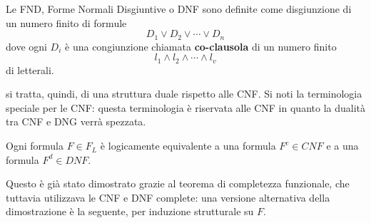 \begin{defi}
Le FND, Forme Normali Disgiuntive o DNF sono definite come disgiunzione di 
un numero finito di formule 
$$
D_1 \lor D_2 \lor \cdots \lor D_n
$$
dove ogni $D_i$ è una congiunzione chiamata \textbf{co-clausola} di un numero finito 
$$
l_1 \land l_2 \land \cdots \land l_v
$$
di letterali. 
\end{defi}

si tratta, quindi, di una struttura duale rispetto alle CNF. 
Si noti la terminologia speciale per le CNF: questa terminologia è riservata 
alle CNF in quanto la dualità tra CNF e DNG verrà spezzata. 

\begin{lem}
Ogni formula $F \in F_L$ è logicamente equivalente a una formula $F^c \in CNF$ 
e a una formula $F^d \in DNF$.
\end{lem}

Questo è già stato dimostrato grazie al teorema 
di completezza funzionale, che tuttavia utilizzava le CNF e DNF complete: una 
versione alternativa della dimostrazione è la seguente, per induzione strutturale 
su $F$. 

